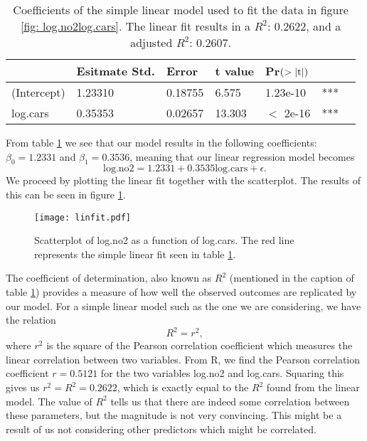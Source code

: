 \documentclass[a4paper, 10pt, reqno]{amsart}
\begin{document}
\begin{table}[h]
\caption{Coefficients of the simple linear model used to fit the data in figure \ref{fig: log.no2log.cars}. The linear fit results in a $R^2$: 0.2622, and a adjusted $R^2$: 0.2607.}
\label{tab: linfit}
\begin{tabular}{lllllll}
\hline\hline
 & Esitmate Std.  & Error & t value & Pr$(>\abs{\mathrm{t}})$ & \\ \hline
(Intercept) & 1.23310 & 0.18755   & 6.575  & 1.23e-10 & ***\\
log.cars   & 0.35353 & 0.02657   & 13.303  & $<$ 2e-16 & ***\\
\hline
\end{tabular}
\end{table}

From table \ref{tab: linfit} we see that our model results in the following coefficients: $\beta_0 = 1.2331$ and $\beta_1 = 0.3536$, meaning that our linear regression model becomes
\begin{equation}
    \mathrm{log.no2} = 1.2331 + 0.3535\mathrm{log.cars} + \epsilon.
\end{equation}
We proceed by plotting the linear fit together with the scatterplot. The results of this can be seen in figure \ref{fig: linfit}.
\begin{figure}[h]
    \centering
    \texttt{[image: linfit.pdf]}
    \caption{Scatterplot of log.no2 as a function of log.cars. The red line represents the simple linear fit seen in table \ref{tab: linfit}.}
    \label{fig: linfit}
\end{figure}
The coefficient of determination, also known as $R^2$ (mentioned in the caption of table \ref{tab: linfit}) provides a measure of how well the observed outcomes are replicated by our model. For a simple linear model such as the one we are considering, we have the relation
\begin{equation}
    R^2 = r^2,
\end{equation}
where $r^2$ is the square of the Pearson correlation coefficient which measures the linear correlation between two variables. From R, we find the Pearson correlation coefficient $r = 0.5121$ for the two variables log.no2 and log.cars. Squaring this gives us $r^2 = R^2 = 0.2622$, which is exactly equal to the $R^2$ found from the linear model. The value of $R^2$ tells us that there are indeed some correlation between these parameters, but the magnitude is not very convincing. This might be a result of us not considering other predictors which might be correlated.
\end{document}
